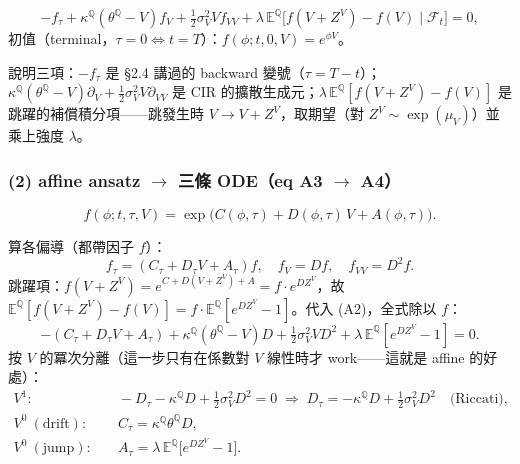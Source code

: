 \documentclass[12pt, a4paper]{article}
\theoremstyle{remark}
\newcommand{\E}{\mathbb{E}}
\newcommand{\Q}{\mathbb{Q}}
\begin{document}
\begin{keybox}[title={eq (A2)：MGF 滿足的 backward PIDE}]
\begin{equation}
  -f_\tau + \kappa^\Q(\theta^\Q-V)f_V + \tfrac12\sigma_V^2 V f_{VV}
  + \lambda\,\E^\Q\!\big[f(V+Z^V)-f(V)\mid\mathcal F_t\big] = 0,
  \tag{A2}
\end{equation}
初值（terminal，$\tau=0\Leftrightarrow t=T$）：$f(\phi;t,0,V)=e^{\phi V}$。
\end{keybox}

說明三項：$-f_\tau$ 是 §2.4 講過的 backward 變號（$\tau=T-t$）；$\kappa^\Q(\theta^\Q-V)\partial_V+\frac12\sigma_V^2 V\partial_{VV}$ 是 CIR 的擴散生成元；$\lambda\,\E^\Q[f(V+Z^V)-f(V)]$ 是跳躍的補償積分項——跳發生時 $V\to V+Z^V$，取期望（對 $Z^V\sim\exp(\mu_V)$）並乘上強度 $\lambda$。

\subsubsection*{(2) affine ansatz $\to$ 三條 ODE（eq A3 $\to$ A4）}

\begin{equation}
  f(\phi;t,\tau,V) = \exp\!\big(C(\phi,\tau) + D(\phi,\tau)\,V + A(\phi,\tau)\big).
  \tag{A3, = eq 10}
\end{equation}

\begin{derivbox}[title={代入 PIDE，按 $V$ 的冪次比對係數}]
算各偏導（都帶因子 $f$）：
\[
  f_\tau = (C_\tau + D_\tau V + A_\tau)f,\quad f_V = Df,\quad f_{VV}=D^2 f.
\]
跳躍項：$f(V+Z^V)=e^{C+D(V+Z^V)+A}=f\cdot e^{DZ^V}$，故 $\E^\Q[f(V+Z^V)-f(V)]=f\cdot\E^\Q[e^{DZ^V}-1]$。代入 (A2)，全式除以 $f$：
\[
  -(C_\tau + D_\tau V + A_\tau) + \kappa^\Q(\theta^\Q-V)D + \tfrac12\sigma_V^2 V D^2
  + \lambda\,\E^\Q[e^{DZ^V}-1] = 0.
\]
按 $V$ 的冪次分離（這一步只有在係數對 $V$ 線性時才 work——這就是 affine 的好處）：
\begin{align*}
  V^1:&\quad -D_\tau - \kappa^\Q D + \tfrac12\sigma_V^2 D^2 = 0
   \;\Rightarrow\; D_\tau = -\kappa^\Q D + \tfrac12\sigma_V^2 D^2 \quad\text{(Riccati)},\\
  V^0\ (\text{drift}):&\quad C_\tau = \kappa^\Q\theta^\Q D,\\
  V^0\ (\text{jump}):&\quad A_\tau = \lambda\,\E^\Q\!\big[e^{DZ^V}-1\big].
\end{align*}
\end{derivbox}
\end{document}
